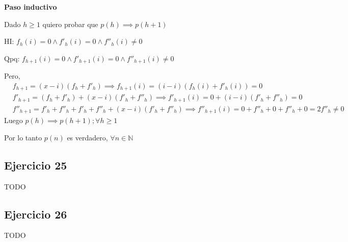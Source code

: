 \textbf{Paso inductivo}

Dado $ h \geq 1 $ quiero probar que $ p(h) \implies p(h+1) $

HI: $ f_h(i) = 0 \wedge f'_h(i) = 0 \wedge f''_h(i) \neq 0 $

Qpq: $ f_{h+1}(i) = 0 \wedge f'_{h+1}(i) = 0 \wedge f''_{h+1}(i) \neq 0 $

Pero,
\begin{align*}
    &f_{h+1} = (x-i)(f_h + f'_h) \implies f_{h+1}(i) = (i-i)(f_h(i) + f'_h(i)) = 0 \\
    &f'_{h+1} = (f_h + f'_h) + (x-i)(f'_h + f''_h) \implies f'_{h+1}(i) = 0 + (i-i)(f'_h + f''_h) = 0 \\
    &f''_{h+1} = f'_h + f''_h + f'_h + f''_h + (x-i)(f'_h + f''_h) \implies f''_{h+1}(i) = 0 + f''_h + 0 + f''_h + 0 = 2f''_h \neq 0
\end{align*}
Luego $ p(h) \implies p(h+1); \forall h \geq 1 $

Por lo tanto $ p(n) $ es verdadero, $ \forall n \in \mathbb{N} $

\subsection{Ejercicio 25}
TODO

\subsection{Ejercicio 26}
TODO


